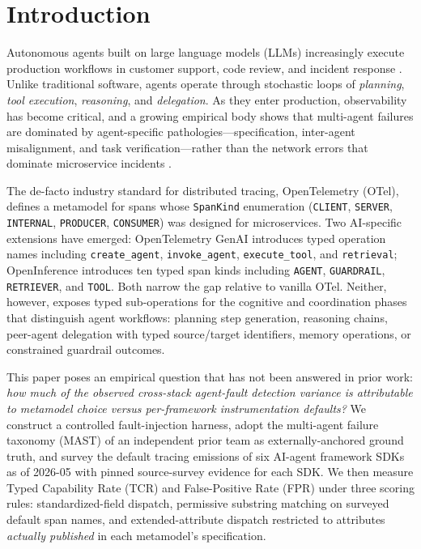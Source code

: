\documentclass[a4paper,UKenglish,cleveref,autoref,thm-restate]{lipics-v2021}
\begin{document}
\section{Introduction}
\label{sec:intro}

Autonomous agents built on large language models (LLMs) increasingly
execute production workflows in customer support, code review, and
incident response \cite{anon-langchain,anon-crewai,anon-autogen}.
Unlike traditional software, agents operate through stochastic loops
of \emph{planning}, \emph{tool execution}, \emph{reasoning}, and
\emph{delegation}.  As they enter production, observability has
become critical, and a growing empirical body shows that multi-agent
failures are dominated by agent-specific pathologies---specification,
inter-agent misalignment, and task verification---rather than the
network errors that dominate microservice incidents
\cite{anon-mast}.

The de-facto industry standard for distributed tracing,
OpenTelemetry (OTel), defines a metamodel for spans whose
\texttt{SpanKind} enumeration (\texttt{CLIENT}, \texttt{SERVER},
\texttt{INTERNAL}, \texttt{PRODUCER}, \texttt{CONSUMER}) was designed
for microservices.  Two AI-specific extensions have emerged:
OpenTelemetry GenAI \cite{anon-otelgenai} introduces typed operation
names including \texttt{create\_agent}, \texttt{invoke\_agent},
\texttt{execute\_tool}, and \texttt{retrieval}; OpenInference
\cite{anon-openinference} introduces ten typed span kinds including
\texttt{AGENT}, \texttt{GUARDRAIL}, \texttt{RETRIEVER}, and
\texttt{TOOL}.  Both narrow the gap relative to vanilla OTel.
Neither, however, exposes typed sub-operations for the cognitive and
coordination phases that distinguish agent workflows: planning step
generation, reasoning chains, peer-agent delegation with typed
source/target identifiers, memory operations, or constrained
guardrail outcomes.

This paper poses an empirical question that has not been answered in
prior work: \emph{how much of the observed cross-stack agent-fault
detection variance is attributable to metamodel choice versus
per-framework instrumentation defaults?}  We construct a controlled
fault-injection harness, adopt the multi-agent failure taxonomy
(MAST) of an independent prior team \cite{anon-mast} as
externally-anchored ground truth, and survey the default tracing
emissions of six AI-agent framework SDKs as of 2026-05 with
pinned source-survey evidence for each SDK. We then measure Typed
Capability Rate (TCR) and False-Positive Rate (FPR) under three
scoring rules: standardized-field dispatch, permissive substring
matching on surveyed default span names, and extended-attribute
dispatch restricted to attributes \emph{actually published} in each
metamodel's specification.
\end{document}
